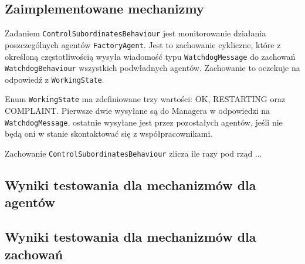 \subsection{Zaimplementowane mechanizmy}
Zadaniem \texttt{ControlSubordinatesBehaviour} jest monitorowanie działania poszczególnych agentów \texttt{FactoryAgent}. Jest to zachowanie cykliczne, które z określoną częstotliwością wysyła wiadomość typu \texttt{WatchdogMessage} do zachowań \texttt{WatchdogBehaviour} wszystkich podwładnych agentów. Zachowanie to oczekuje na odpowiedź z \texttt{WorkingState}. 

Enum \texttt{WorkingState} ma zdefiniowane trzy wartości: OK, RESTARTING oraz COMPLAINT. Pierwsze dwie wysyłane są do Managera w odpowiedzi na \texttt{WatchdogMessage}, ostatnie wysyłane jest przez pozostałych agentów, jeśli nie będą oni w stanie skontaktować się z współpracownikami.

Zachowanie \texttt{ControlSubordinatesBehaviour} zlicza ile razy pod rząd ...

\subsection{Wyniki testowania dla mechanizmów dla agentów}

\subsection{Wyniki testowania dla mechanizmów dla zachowań}



